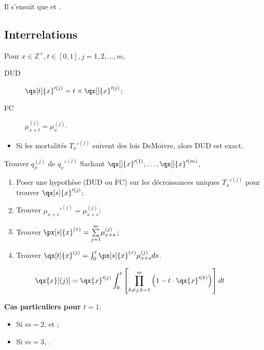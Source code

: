 \documentclass[10pt, french]{article}
\begin{document}
\begin{multicols*}{2}
Il s'ensuit que  et .

\subsection{Interrelations}
\begin{rappel_enhanced}[Hypothèses]
Pour $x \in \mathbb{Z}^{+}, t \in [0, 1], j = 1, 2, \dots, m$,
\begin{description}
	\item[DUD]	$\qx[t]{x}'^{(j)} = t \times \qx[]{x}'^{(j)}$;
	\item[FC]	$\mu_{x + t}^{(j)} = \mu_{x}^{(j)}$.
\end{description}

\begin{itemize}[leftmargin = *]
	\item	Si les mortalités $T_{x}'^{(j)}$ suivent des lois DeMoivre, alors DUD est exact.
\end{itemize}
\end{rappel_enhanced}

\begin{conceptgen}{Trouver $q_{x}^{(j)}$ de $q_{x}'^{(j)}$}
Sachant $\qx[]{x}'^{(1)}, \dots, \qx[]{x}'^{(m)}$,
\begin{enumerate}
	\item	Poser une hypothèse (DUD ou FC) sur les décroissances uniques $T_{x}'^{(j)}$ pour trouver $\qx[s]{x}'^{(j)}$;
	\item	Trouver $\mu_{x + s}'^{(j)}	=	\mu_{x + s}^{(j)}$;
	\item	Trouver $\px[s]{x}^{(\tau)}	=	\sumz{m}{j = 1}\mu_{x + s}^{(j)}$;
	\item	Trouver $\qx[t]{x}^{(j)}	=	\int_{0}^{t}\px[s]{x}^{(\tau)}\mu_{x + s}^{(j)}ds$.
\end{enumerate}

\begin{distributions}
\begin{align*}
	\qx{x}[(j)]
	&=	\qx{x}'^{(j)}	\int_{0}^{t} \left[ \underset{k \neq j, k = 1}{\overset{m}{\prod}}\left(1 - t \cdot \qx{x}'^{(k)}\right) \right] dt
\end{align*}

\tcbline

\textbf{Cas particuliers pour $t = 1$}:
\begin{itemize}[leftmargin = *]
	\item	Si $m = 2$,  et ;
	\item	Si $m = 3$, .
\end{itemize}
\end{distributions}


\end{conceptgen}
\end{multicols*}
\end{document}
